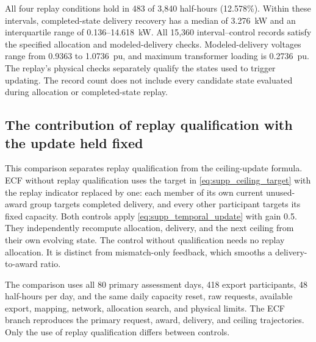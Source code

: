 \documentclass[11pt]{article}
\begin{document}
All four replay conditions hold in 483 of 3,840 half-hours (12.578\%).
Within these intervals, completed-state delivery recovery has a median of
3.276~kW and an interquartile range of 0.136--14.618~kW.
All 15,360 interval--control records satisfy the specified allocation and
modeled-delivery checks. Modeled-delivery voltages range from 0.9363 to
1.0736~pu, and maximum transformer loading is 0.2736~pu. The replay's physical
checks separately qualify the states used to trigger updating.
The record count does not include every candidate state evaluated during
allocation or completed-state replay.

\subsection{The contribution of replay qualification with the update held fixed}
\label{supp:same_update_qualification}

This comparison separates replay qualification from the ceiling-update
formula. ECF without replay qualification uses the target in
\eqref{eq:supp_ceiling_target} with the replay indicator replaced by one:
each member of its own current unused-award group targets completed delivery,
and every other participant targets its fixed capacity. Both controls apply
\eqref{eq:supp_temporal_update} with gain 0.5. They independently recompute
allocation, delivery, and the next ceiling from their own evolving state.
The control without qualification needs no replay allocation. It is distinct
from mismatch-only feedback, which smooths a delivery-to-award ratio.

The comparison uses all 80 primary assessment days, 418 export participants,
48 half-hours per day, and the same daily capacity reset, raw requests,
available export, mapping, network, allocation search, and physical limits.
The ECF branch reproduces the primary request, award, delivery, and ceiling
trajectories. Only the use of replay qualification differs between controls.
\end{document}
